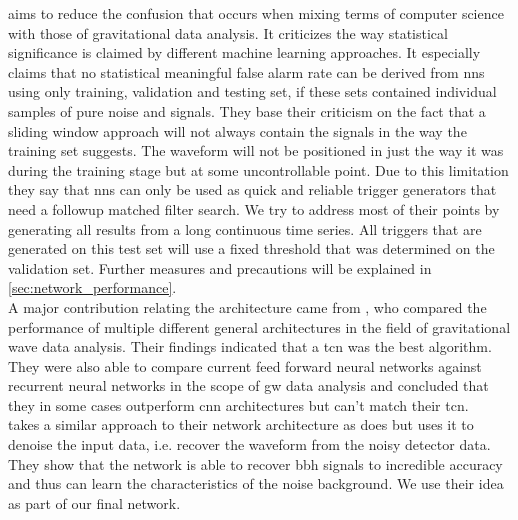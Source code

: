 \cite{cnn_magiacal_bullet} aims to reduce the confusion that occurs when mixing terms of computer science with those of gravitational data analysis. It criticizes the way statistical significance is claimed by different machine learning approaches. It especially claims that no statistical meaningful false alarm rate can be derived from \gls{nns} using only training, validation and testing set, if these sets contained individual samples of pure noise and signals. They base their criticism on the fact that a sliding window approach will not always contain the signals in the way the training set suggests. The waveform will not be positioned in just the way it was during the training stage but at some uncontrollable point. Due to this limitation they say that \gls{nns} can only be used as quick and reliable trigger generators that need a followup matched filter search. We try to address most of their points by generating all results from a long continuous time series. All triggers that are generated on this test set will use a fixed threshold that was determined on the validation set. Further measures and precautions will be explained in \autoref{sec:network_performance}.\\
A major contribution relating the architecture came from \cite{tcn_idea}, who compared the performance of multiple different general architectures in the field of gravitational wave data analysis. Their findings indicated that a \gls{tcn} was the best algorithm. They were also able to compare current feed forward neural networks against recurrent neural networks in the scope of \gls{gw} data analysis and concluded that they in some cases outperform \gls{cnn} architectures but can't match their \gls{tcn}.\\
\cite{dnn_denoising} takes a similar approach to their network architecture as \cite{tcn_idea} does but uses it to denoise the input data, i.e. recover the waveform from the noisy detector data. They show that the network is able to recover \gls{bbh} signals to incredible accuracy and thus can learn the characteristics of the noise background. We use their idea as part of our final network.
